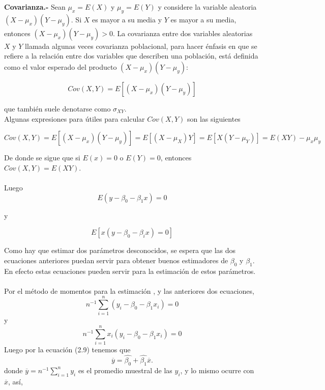 \textbf{Covarianza.-} Sean $\mu_x = E(X)$ y $\mu_y = E(Y)$ y considere la variable aleatoria $(X-\mu_x)(Y-\mu_y)$. Si $X$ es mayor a su media y $Y$ es mayor a su media, entonces $(X-\mu_x)(Y-\mu_y)>0$. La covarianza entre dos variables aleatorias $X$ y $Y$ llamada algunas veces covarianza poblacional, para hacer énfasis en que se refiere a la relación entre dos variables que describen una población, está definida como el valor esperado del producto $(X-\mu_x)(Y-\mu_y)$: 

\begin{equation}
    Cov(X,Y) = E\left[(X-\mu_x)(Y-\mu_y)\right]
\end{equation}

que también suele denotarse como $\sigma_{XY}.$  \\
Algunas expresiones para útiles para calcular $Cov(X,Y)$ son las siguientes

\begin{equation}
    Cov(X,Y) = E\left[(X-\mu_x)(Y-\mu_y)\right] = E\left[(X-\mu_X)Y\right] = E\left[X(Y-\mu_Y)\right] = E(XY) - \mu_x \mu_y
\end{equation}

De donde se sigue que si $E(x)=0$ o $E(Y)=0$, entonces $Cov(X,Y) = E(XY)$.\\\\

Luego  
\begin{equation}
    E(y - \beta_0 - \beta_1x) = 0
\end{equation}
 
y 

\begin{equation}
    E\left[x(y - \beta_0 -\beta_i x )= 0\right]
\end{equation}

Como hay que estimar dos parámetros desconocidos, se espera que las dos ecuaciones anteriores puedan servir para obtener buenos estimadores de $\beta_0$ y $\beta_1$. En efecto estas ecuaciones pueden servir para la estimación de estos parámetros.\\\\

Por el método de momentos para la estimación , y las anteriores dos ecuaciones,
\begin{equation}
    n^{-1} \sum\limits_{i=1}^n (y_i - \beta_0 - \beta_1x_i) = 0
\end{equation}
y 
\begin{equation}
    n^{-1} \sum\limits_{i=1}^n x_i(y_i - \beta_0 - \beta_1x_i) = 0
\end{equation}
Luego por la ecuación (2.9) tenemos que 
\begin{equation}
    \overline{y} = \hat{\beta_0} + \hat{\beta_1}\overline{x}.
\end{equation}
donde $\overline{y} = n^{-1}\sum\limits_{i=1}^n y_i$ es el promedio muestral de las $y_i$, y lo mismo ocurre con $\overline{x}$, así, 

